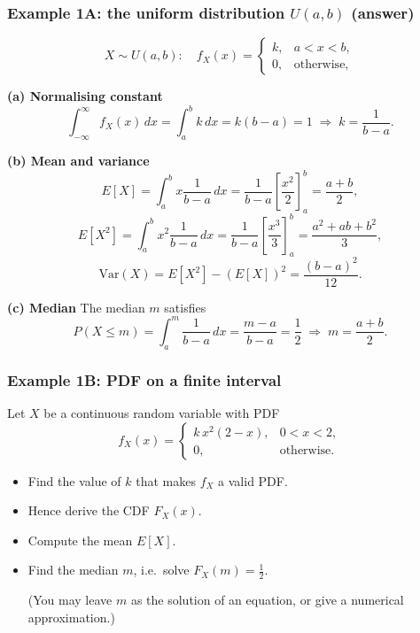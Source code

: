 \documentclass[t,8pt]{beamer}
\begin{document}
	\begin{frame}
		\frametitle{Example 1A: the uniform distribution $U(a,b)$ (answer)}
		\[
		X \sim U(a,b):\quad f_X(x) =
		\begin{cases}
			k, & a < x < b,\\
			0, & \text{otherwise},
		\end{cases}
		\]
		
		\vspace{4pt}
		{\bf (a) Normalising constant}
		\[
		\int_{-\infty}^{\infty} f_X(x)\,dx
		= \int_a^b k\,dx = k(b-a) = 1
		\;\Rightarrow\; k = \frac{1}{b-a}.
		\]
		
		{\bf (b) Mean and variance}
		\[
		E[X] = \int_a^b x \frac{1}{b-a}\,dx 
		= \frac{1}{b-a}\left[\frac{x^2}{2}\right]_a^b
		= \frac{a+b}{2},
		\]
		\[
		E[X^2] = \int_a^b x^2 \frac{1}{b-a}\,dx
		= \frac{1}{b-a}\left[\frac{x^3}{3}\right]_a^b
		= \frac{a^2+ab+b^2}{3},
		\]
		\[
		\mathrm{Var}(X) = E[X^2] - (E[X])^2 
		= \frac{(b-a)^2}{12}.
		\]
		
		{\bf (c) Median}
		The median $m$ satisfies
		\[
		P(X \le m) = \int_a^m \frac{1}{b-a}\,dx = \frac{m-a}{b-a} = \frac{1}{2}
		\;\Rightarrow\; m = \frac{a+b}{2}.
		\]
	\end{frame}
	
	
	\begin{frame}
		\frametitle{Example 1B: PDF on a finite interval}
		
		Let $X$ be a continuous random variable with PDF
		\[
		f_X(x) = \begin{cases}
			k\,x^2(2-x), & 0 < x < 2,\\[4pt]
			0, & \text{otherwise.}
		\end{cases}
		\]
		
		\begin{itemize}
			\item[(a)] Find the value of $k$ that makes $f_X$ a valid PDF.
			\item[(b)] Hence derive the CDF $F_X(x)$.
			\item[(c)] Compute the mean $E[X]$.
			\item[(d)] Find the median $m$, i.e.\ solve $F_X(m)=\tfrac12$. \par
			{\small\color{NavyBlue} (You may leave $m$ as the solution of an equation, or give a numerical approximation.)}
		\end{itemize}
		
	\end{frame}
	
\end{document}
